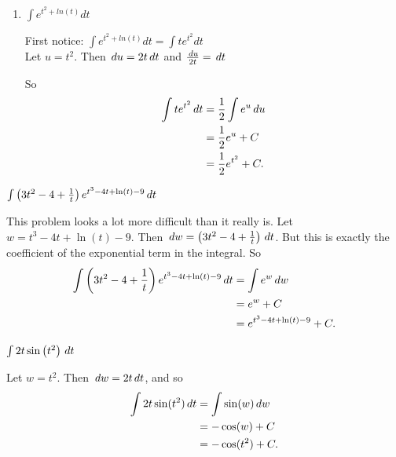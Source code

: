 \documentclass[nooutcomes]{ximera}
\begin{document}
\begin{problem}
\begin{enumerate}
	\item $\int e^{t^2+ln(t)}dt$	
				\begin{freeResponse}
		First notice: $\int e^{t^2+ln(t)}dt=\int te^{t^2}dt$\\
		Let $u = t^2$.  Then $\,d u = 2t \,d t$ and $\frac{\,d u}{2t} = \,d t$
			
		So
			\begin{align*}
			 \int te^{t^2} \,d t &= \frac{1}{2} \int e^u \,d u  \\
			&= \frac{1}{2}e^u+ C\\
			&= \frac{1}{2}e^{t^2} + C.
			\end{align*}
			\end{freeResponse}
	\end{enumerate}
\end{problem}

\begin{problem}
  $\int \left( 3t^2 - 4 + \frac{1}{t} \right) e^{t^3 - 4t + \ln(t) -
    9} \,d t$
  \begin{freeResponse}
    This problem looks a lot more difficult than it really is.
    Let $w=t^3 - 4t + \ln(t) - 9$.
    Then $\,d w = \left( 3t^2 - 4 + \frac{1}{t} \right) \,d t$.
    But this is exactly the coefficient of the exponential term in the integral.
    So
    \begin{align*}
      \int \left( 3t^2 - 4 + \frac{1}{t} \right) e^{t^3 - 4t + \ln(t) - 9} \,d t &= \int e^w \,d w  \\                                                                           &= e^w + C  \\                                                                                &= e^{t^3 - 4t + \ln(t) - 9} + C.
    \end{align*}
  \end{freeResponse}
\end{problem}

\begin{problem}
$\int 2t \sin \left( t^2 \right) \,d t$
  \begin{freeResponse}
    Let $w=t^2$.  Then $\,d w = 2t \,d t$, and so
    \begin{align*}
      \int 2t \sin(t^2) \,d t &= \int \sin(w) \,d w  \\
                             &= - \cos(w) + C  \\
                             &= - \cos(t^2) + C.
    \end{align*}
  \end{freeResponse}
\end{problem}
\end{document}
